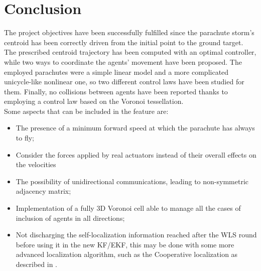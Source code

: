 \section{Conclusion}
The project objectives have been successfully fulfilled since the parachute storm's centroid has been correctly driven from the initial point to the ground target. The prescribed centroid trajectory has been computed with an optimal controller, while two ways to coordinate the agents' movement have been proposed. The employed parachutes were a simple linear model and a more complicated unicycle-like nonlinear one, so two different control laws have been studied for them. Finally, no collisions between agents have been reported thanks to employing a control law based on the Voronoi tessellation. \\
Some aspects that can be included in the feature are:
\begin{itemize}
    \item The presence of a minimum forward speed at which the parachute has always to fly;
    \item Consider the forces applied by real actuators instead of their overall effects on the velocities
    \item The possibility of unidirectional communications, leading to non-symmetric adjacency matrix; 
    \item Implementation of a fully 3D Voronoi cell able to manage all the cases of inclusion of agents in all directions;
    \item Not discharging the self-localization information reached after the WLS round before using it in the new KF/EKF, this may be done with some more advanced localization algorithm, such as the Cooperative localization as described in \cite{b14}.
\end{itemize}